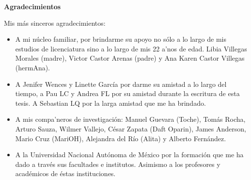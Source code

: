 \textbf{\Huge{Agradecimientos}}

\vspace{4cm}

Mis más sinceros agradecimientos:
\begin{itemize} 

\item A mi núcleo familiar, por brindarme su apoyo no sólo a lo largo
de mis estudios de licenciatura sino a lo largo de mis 22 a'nos de edad. Libia
Villegas Morales (madre), Victor Castor Arenas (padre) y Ana Karen Castor Villegas (hermAna).

\item A Jenifer Wences y Linette García por darme su amistad a lo largo del tiempo,
a Pau LC y Andrea FL por su amistad durante la escritura de esta tesis. A Sebastian LQ
por la larga amistad que me ha brindado.

\item A mis compa'neros de investigación: Manuel Guevara (Toche), Tomás Rocha,
Arturo Sauza, Wilmer Vallejo, César Zapata (Daft Oparin), James Anderson,
Mario Cruz (MariOH), Alejandra del Río (Alita) y Alberto Fernández.

\item A la Universidad Nacional Autónoma de México por la formación que me ha dado
a través sus facultades e institutos. Asimismo a los profesores y académicos de éstas
instituciones.

\end{itemize}
\vspace*{\fill}

\newpage
\thispagestyle{empty}

